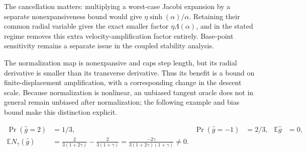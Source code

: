 The cancellation matters: multiplying a worst-case Jacobi expansion by a separate nonexpansiveness bound would give $\eta\sinh(\alpha)/\alpha$. Retaining their common radial variable gives the exact smaller factor $\eta\Lambda(\alpha)$, and in the stated regime removes this extra velocity-amplification factor entirely. Base-point sensitivity remains a separate issue in the coupled stability analysis.

The normalization map is nonexpansive and caps step length, but its radial derivative is smaller than its transverse derivative. Thus its benefit is a bound on finite-displacement amplification, with a corresponding change in the descent scale. Because normalization is nonlinear, an unbiased tangent oracle does not in general remain unbiased after normalization; the following example and bias bound make this distinction explicit.

\begin{proposition}
\begin{align}
 \Pr(\widehat g=2)&=1/3,&\Pr(\widehat g=-1)&=2/3,&\mathbb E\widehat g&=0,\\
 \mathbb EN_\gamma(\widehat g)
 &=\frac2{3(1+2\gamma)}-\frac2{3(1+\gamma)}
 =\frac{-2\gamma}{3(1+2\gamma)(1+\gamma)}\ne0.
\end{align}
\end{proposition}


